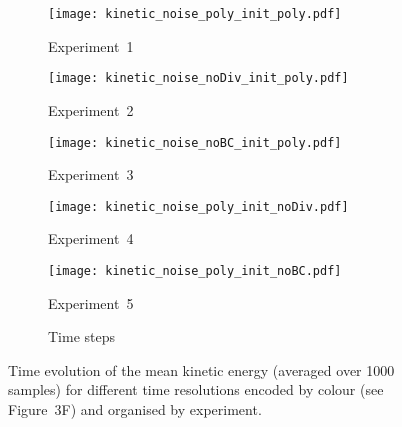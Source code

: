 \documentclass[tikz]{standalone}
\begin{document}
\begin{figure}
\begin{subfigure}[t]{0.5\textwidth}
        \centering   
        \texttt{[image: kinetic\_noise\_poly\_init\_poly.pdf]}
        \caption{Experiment~1}
\end{subfigure}%
\begin{subfigure}[t]{0.5\textwidth}
        \centering   
		\texttt{[image: kinetic\_noise\_noDiv\_init\_poly.pdf]}
        \caption{Experiment~2}
\end{subfigure}
\begin{subfigure}[t]{0.5\textwidth}
        \centering   
		\texttt{[image: kinetic\_noise\_noBC\_init\_poly.pdf]}
        \caption{Experiment~3}
\end{subfigure}%
\begin{subfigure}[t]{0.5\textwidth}
        \centering   
		\texttt{[image: kinetic\_noise\_poly\_init\_noDiv.pdf]}
        \caption{Experiment~4}
\end{subfigure}
\begin{subfigure}[t]{0.5\textwidth}
        \centering   
		\texttt{[image: kinetic\_noise\_poly\_init\_noBC.pdf]}
        \caption{Experiment~5}
\end{subfigure}%
\begin{subfigure}[t]{0.5\textwidth}
        \centering
        \caption{Time steps}
        \label{subfig:legend}
\end{subfigure}%
\caption{Time evolution of the mean kinetic energy (averaged over 1000 samples) for different time resolutions encoded by colour (see Figure~3F) and organised by experiment.}
\end{figure}
\end{document}
